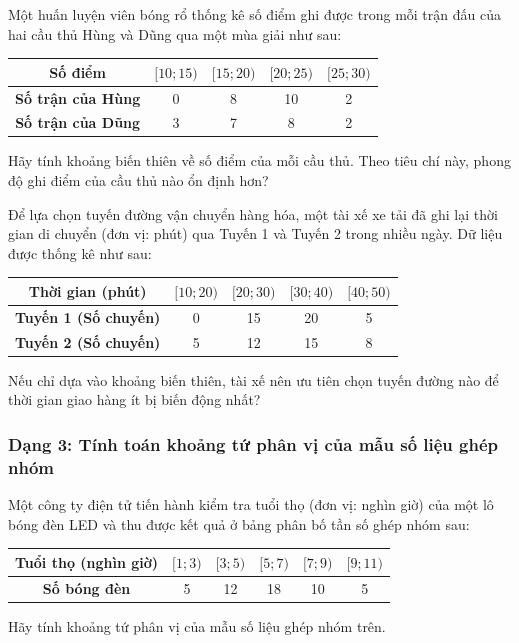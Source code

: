 \documentclass[12pt]{article}
\begin{document}
	\begin{btdo}[title={Bài 5}]
		Một huấn luyện viên bóng rổ thống kê số điểm ghi được trong mỗi trận đấu của hai cầu thủ Hùng và Dũng qua một mùa giải như sau:
		\begin{center}
			\renewcommand{\arraystretch}{1.3}
			\begin{tabular}{|c|c|c|c|c|}
				\hline
				\textbf{Số điểm} & $[10; 15)$ & $[15; 20)$ & $[20; 25)$ & $[25; 30)$ \\
				\hline
				\textbf{Số trận của Hùng} & 0 & 8 & 10 & 2 \\
				\hline
				\textbf{Số trận của Dũng} & 3 & 7 & 8 & 2 \\
				\hline
			\end{tabular}
		\end{center}
		Hãy tính khoảng biến thiên về số điểm của mỗi cầu thủ. Theo tiêu chí này, phong độ ghi điểm của cầu thủ nào ổn định hơn?
	\end{btdo}
	
	\begin{btdo}[title={Bài 6}]
		Để lựa chọn tuyến đường vận chuyển hàng hóa, một tài xế xe tải đã ghi lại thời gian di chuyển (đơn vị: phút) qua Tuyến 1 và Tuyến 2 trong nhiều ngày. Dữ liệu được thống kê như sau:
		\begin{center}
			\renewcommand{\arraystretch}{1.3}
			\begin{tabular}{|c|c|c|c|c|}
				\hline
				\textbf{Thời gian (phút)} & $[10; 20)$ & $[20; 30)$ & $[30; 40)$ & $[40; 50)$ \\
				\hline
				\textbf{Tuyến 1 (Số chuyến)} & 0 & 15 & 20 & 5 \\
				\hline
				\textbf{Tuyến 2 (Số chuyến)} & 5 & 12 & 15 & 8 \\
				\hline
			\end{tabular}
		\end{center}
		Nếu chỉ dựa vào khoảng biến thiên, tài xế nên ưu tiên chọn tuyến đường nào để thời gian giao hàng ít bị biến động nhất?
	\end{btdo}
	
	\subsubsection{Dạng 3: Tính toán khoảng tứ phân vị của mẫu số liệu ghép nhóm}
	
	\begin{btxanh}[title={Bài 1}]
		Một công ty điện tử tiến hành kiểm tra tuổi thọ (đơn vị: nghìn giờ) của một lô bóng đèn LED và thu được kết quả ở bảng phân bố tần số ghép nhóm sau:
		\begin{center}
			\renewcommand{\arraystretch}{1.3}
			\begin{tabular}{|c|c|c|c|c|c|}
				\hline
				\textbf{Tuổi thọ (nghìn giờ)} & $[1; 3)$ & $[3; 5)$ & $[5; 7)$ & $[7; 9)$ & $[9; 11)$ \\
				\hline
				\textbf{Số bóng đèn} & 5 & 12 & 18 & 10 & 5 \\
				\hline
			\end{tabular}
		\end{center}
		Hãy tính khoảng tứ phân vị của mẫu số liệu ghép nhóm trên.
	\end{btxanh}
	
\end{document}

